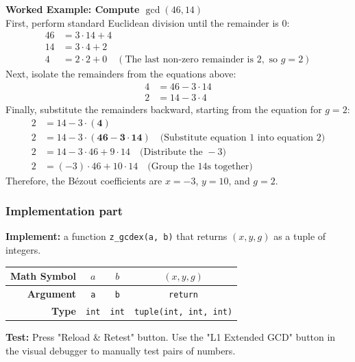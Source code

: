\documentclass[11pt]{article}
\begin{document}
\vspace{0.5cm}
\noindent\textbf{Worked Example: Compute $\gcd(46, 14)$} \\
First, perform standard Euclidean division until the remainder is $0$:
\begin{align*}
46 &= 3 \cdot 14 + 4 \\
14 &= 3 \cdot 4 + 2 \\
4 &= 2 \cdot 2 + 0 \quad (\text{The last non-zero remainder is } 2, \text{ so } g=2)
\end{align*}
Next, isolate the remainders from the equations above:
\begin{align}
4 &= 46 - 3 \cdot 14 \\
2 &= 14 - 3 \cdot 4
\end{align}
Finally, substitute the remainders backward, starting from the equation for $g=2$:
\begin{align*}
2 &= 14 - 3 \cdot (\mathbf{4}) \\
2 &= 14 - 3 \cdot (\mathbf{46 - 3 \cdot 14}) \quad \text{(Substitute equation 1 into equation 2)} \\
2 &= 14 - 3 \cdot 46 + 9 \cdot 14 \quad \text{(Distribute the }-3\text{)} \\
2 &= (-3) \cdot 46 + 10 \cdot 14 \quad \text{(Group the }14\text{s together)}
\end{align*}
Therefore, the Bézout coefficients are $x = -3$, $y = 10$, and $g = 2$.

\subsubsection*{Implementation part}
\textbf{Implement:} a function \lstinline|z_gcdex(a, b)| that returns $(x, y, g)$ as a tuple of integers.
\begin{center}
\renewcommand{\arraystretch}{2.0}
\begin{tabular}{r | c | c | c }
\toprule
\textbf{Math Symbol} & $a$ & $b$ & $(x, y, g)$ \\ \midrule
\textbf{Argument} & \lstinline|a| & \lstinline|b| & \lstinline|return| \\ \midrule
\textbf{Type} & \lstinline|int| & \lstinline|int| & \lstinline|tuple(int, int, int)| \\
\bottomrule
\end{tabular}
\end{center}
\textbf{Test:} Press "Reload \& Retest" button. Use the "L1 Extended GCD" button in the visual debugger to manually test pairs of numbers.
\end{document}
